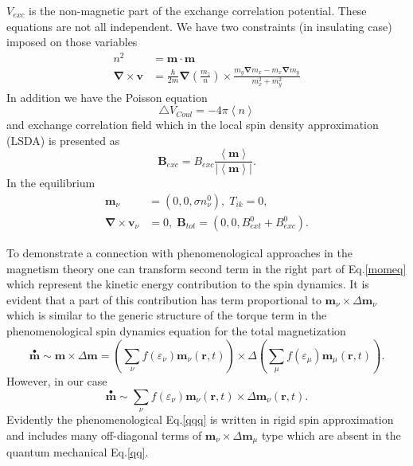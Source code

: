 \documentclass[aps,preprint,twocolumn,10pt]{revtex4}%
\begin{document}
$V_{exc}$ is the non-magnetic part of the exchange correlation potential.
These equations are not all independent. We have two constraints (in
insulating case) imposed on those variables%
\begin{align}
n^{2} &  =\mathbf{m}\cdot\mathbf{m}\label{constr1}\\
\mathbf{\nabla}\times\mathbf{v} &  \mathbf{=}\frac{\hbar}{2m}\mathbf{\nabla
}\left(  \frac{m_{z}}{n}\right)  \times\frac{m_{y}\mathbf{\nabla}m_{x}%
-m_{x}\mathbf{\nabla}m_{y}}{m_{x}^{2}+m_{y}^{2}}\label{constr2}%
\end{align}
In addition we have the Poisson equation%
\begin{equation}
\triangle V_{Coul}=-4\pi\left\langle n\right\rangle \label{Poisson}%
\end{equation}
and exchange correlation field which in the local spin density approximation
(LSDA) is presented as%
\begin{equation}
\mathbf{B}_{exc}=B_{exc}\frac{\left\langle \mathbf{m}\right\rangle
}{\left\vert \left\langle \mathbf{m}\right\rangle \right\vert }.\label{Stoner}%
\end{equation}
In the equilibrium%
\begin{align}
\mathbf{m}_{\nu} &  =\left(  0,0,\sigma n_{\nu}^{0}\right)  ,\;T_{ik}%
=0,\label{equistatemT}\\
\mathbf{\nabla}\times\mathbf{v}_{\nu} &  =0,\;\mathbf{B}_{tot}=\left(
0,0,B_{ext}^{0}+B_{exc}^{0}\right)  .\label{equistatevB}%
\end{align}


To demonstrate a connection with phenomenological approaches in the magnetism
theory one can transform second term in the right part of Eq.\ref{momeq} which
represent the kinetic energy contribution to the spin dynamics. It is evident
that a part of this contribution has term proportional to $\mathbf{m}_{\nu
}\times\Delta\mathbf{m}_{\nu}$ which is similar to the generic structure of
the torque term in the phenomenological spin dynamics equation for the total
magnetization\cite{SW}%
\begin{equation}
\overset{\bullet}{\mathbf{m}}\sim\mathbf{m}\times\Delta\mathbf{m=}\left(
\sum_{\nu}f\left(  \varepsilon_{\nu}\right)  \mathbf{m}_{\nu}\left(
\mathbf{r},t\right)  \right)  \times\Delta\left(  \sum_{\mu}f\left(
\varepsilon_{\mu}\right)  \mathbf{m}_{\mu}\left(  \mathbf{r},t\right)
\right)  . \label{qqq}%
\end{equation}
However, in our case
\begin{equation}
\overset{\bullet}{\mathbf{m}}\sim\sum_{\nu}f\left(  \varepsilon_{\nu}\right)
\mathbf{m}_{\nu}\left(  \mathbf{r},t\right)  \times\Delta\mathbf{m}_{\nu
}\left(  \mathbf{r},t\right)  . \label{qq}%
\end{equation}
Evidently the phenomenological Eq.\ref{qqq} is written in rigid spin
approximation and includes many off-diagonal terms of $\mathbf{m}_{\nu}%
\times\Delta\mathbf{m}_{\mu}$ type which are absent in the quantum mechanical
Eq.\ref{qq}.
\end{document}
